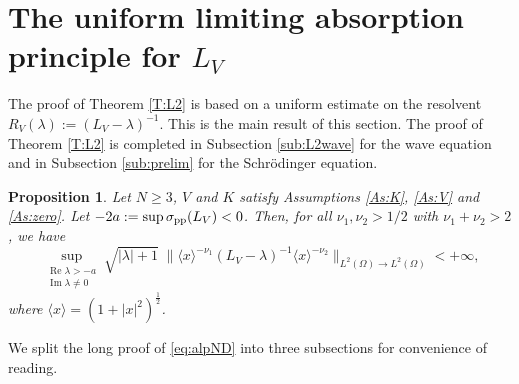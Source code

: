 \documentclass[10pt,leqno]{amsart}
\DeclareMathOperator{\im}{Im} %
\DeclareMathOperator{\re}{Re} %
\newtheorem{proposition}[theorem]{Proposition}
\theoremstyle{definition}%
\theoremstyle{remark}
\numberwithin{equation}{section}
\renewcommand{\^}{\widehat}%
\begin{document}
\section{The uniform limiting absorption principle for $L_V$}
\label{S:uniform}
The proof of Theorem \ref{T:L2} is  based on a uniform  estimate on the resolvent $R_V(\lambda):=(L_V-\lambda)^{-1}$. This is the main result of this section. The proof of Theorem \ref{T:L2} is completed in Subsection \ref{sub:L2wave} for the wave equation and in Subsection \ref{sub:prelim} for the Schr\"odinger equation.
\begin{proposition}
	\label{pp:alpND}
	Let $N\geq 3$, $V$ and $K$ satisfy Assumptions \ref{As:K}, \ref{As:V} and \ref{As:zero}. Let  $-2a:=\sup \sigma_{\rm pp}(L_V)<0$. Then, for all $\nu_1,\nu_2>1/2$ with 
	$\nu_1+\nu_2>2$, we have
	\begin{equation}
	\label{eq:alpND}
	\sup_{\substack{\re \lambda>-a\\ \im \lambda\neq 0}}
	\sqrt{|\lambda|+1}
	\;	\|\langle x\rangle^{-\nu_1}
	(L_V-\lambda)^{-1}\langle x\rangle^{-\nu_2}\|_{L^2(\Omega)\to L^2(\Omega)}<+\infty,
	\end{equation}
	where $\langle x\rangle=(1+|x|^2)^\frac{1}{2}$.
\end{proposition}
We split the long proof of \eqref{eq:alpND} into three subsections for convenience of reading.
\end{document}
